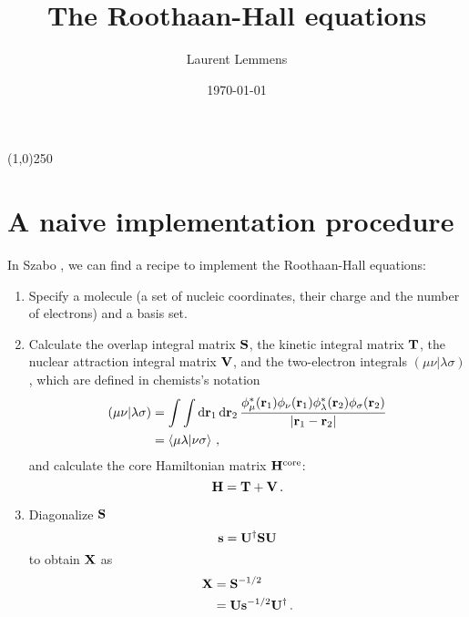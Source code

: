 \documentclass[12pt]{article}
\title{The Roothaan-Hall equations}
\author{Laurent Lemmens}
\date{\today \hspace{6pt} \currenttime}
\begin{document}
\maketitle

\begin{center}
\line(1,0){250}
\end{center}

\tableofcontents
\newpage


\section{A naive implementation procedure}
    In Szabo \cite{szabo}, we can find a recipe to implement the Roothaan-Hall equations:
    \begin{enumerate}
        \item Specify a molecule (a set of nucleic coordinates, their charge and the number of electrons) and a basis set.

        \item Calculate the overlap integral matrix $\vb{S}$, the kinetic integral matrix $\vb{T}$, the nuclear attraction integral matrix $\vb{V}$, and the two-electron integrals $(\mu \nu|\lambda \sigma)$, which are defined in chemists's notation
        \begin{align}
            (\mu \nu|\lambda \sigma) &= \int \int \dd{\vb{r}_1} \dd{\vb{r}_2} \frac{\phi_\mu^*(\vb{r}_1) \phi_\nu(\vb{r}_1) \phi_\lambda^*(\vb{r}_2) \phi_\sigma(\vb{r}_2)}{|\vb{r}_1 - \vb{r}_2|} \\
            &= \braket{\mu \lambda}{\nu \sigma} \thinspace ,
        \end{align}
        and calculate the core Hamiltonian matrix $\vb{H}^\text{core}$:
        \begin{equation}
            \vb{H} = \vb{T} + \vb{V} \thinspace .
        \end{equation}

        \item Diagonalize $\vb{S}$
        \begin{equation}
            \vb{s} = \vb{U}^\dagger \vb{S} \vb{U}
        \end{equation}
        to obtain $\vb{X}$ as
        \begin{align}
            \vb{X} &= \vb{S}^{-1/2} \\
            &= \vb{U} \vb{s}^{-1/2} \vb{U}^\dagger \thinspace .
        \end{align}


\end{enumerate}
\end{document}
